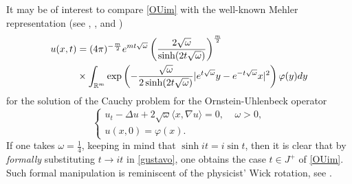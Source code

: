 \documentclass[11pt,a4paper]{amsart}
\def \vf{\varphi}
\newcommand{\Rm}{\mathbb R^m}
\numberwithin{equation}{section}
\numberwithin{equation}{section}
\begin{document}
It may be of interest to compare \eqref{OUim} with the well-known Mehler representation (see \cite{OU}, \cite{SS}, \cite{Bo2} and \cite{LMP}) 
\begin{align}\label{gustavo}
u(x,t) & = (4\pi)^{- \frac m2} e^{m t \sqrt \omega} \left(\frac{2\sqrt \omega}{\sinh(2t\sqrt \omega)}\right)^{\frac m2}
\\
& \times \int_{\Rm} \exp\left( -  \frac{\sqrt \omega}{2 \sinh(2t\sqrt \omega)} |e^{t\sqrt \omega} y - e^{-t\sqrt \omega} x|^2\right) \vf(y) dy
\notag
\end{align}
for the solution of the Cauchy problem for the Ornstein-Uhlenbeck operator
\begin{equation}\label{cpou}
\begin{cases}
u_t - \Delta u + 2 \sqrt \omega \langle x,\nabla u\rangle  = 0,\ \ \ \ \ \omega>0,
\\
u(x,0) = \vf(x).
\end{cases}
\end{equation}
 If one takes $\omega = \frac 14$, keeping in mind that $\sinh it = i \sin t$, then it is clear that by \emph{formally} substituting $t\to it$ in \eqref{gustavo}, one obtains the case $t\in J^+$ of \eqref{OUim}. Such formal manipulation is reminiscent of the physicist' Wick rotation, see \cite[Section 3]{Wi}.
\end{document}
